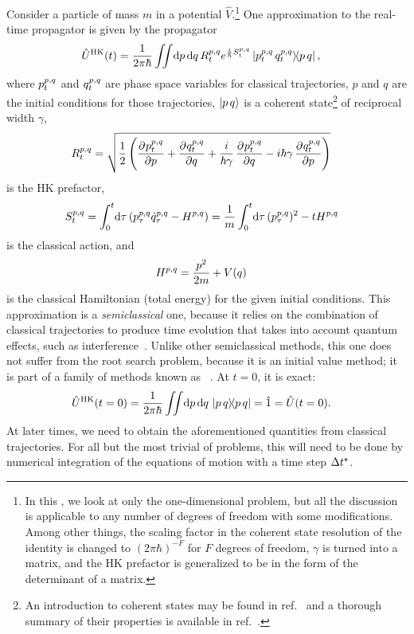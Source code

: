 Consider a particle of mass $m$ in a potential $\hat{V}$.\footnote{
	In this , we look at only the one-dimensional problem, but all the discussion is applicable to any number of degrees of freedom with some modifications.
	Among other things, the scaling factor in the coherent state resolution of the identity is changed to $(2 \pi \hbar)^{-F}$ for $F$ degrees of freedom, $\gamma$ is turned into a matrix, and the HK prefactor is generalized to be in the form of the determinant of a matrix.
}
One approximation to the real-time propagator is given by the  propagator~\cite{miller2002alternate}
\begin{align}
	\hat{U}\hk(t)
	&= \frac{1}{2 \pi \hbar} \iint\! \dif p \dif q \,
			R\coh{p}{q}_t e^{\frac{i}{\hbar} S\coh{p}{q}_t}
			\ketbra{p\coh{p}{q}_t \, q\coh{p}{q}_t}{p \, q},
\end{align}
where $p^{p,q}_t$ and $q^{p,q}_t$ are phase space variables for classical trajectories, $p$ and $q$ are the initial conditions for those trajectories, $\ket{p \, q}$ is a coherent state\footnote{
	An introduction to coherent states may be found in ref.~\cite[242-245]{schulman1996techniques} and a thorough summary of their properties is available in ref.~\cite[99-106]{gardiner2004quantum}.
} of reciprocal width $\gamma$,
\begin{align}
	R\coh{p}{q}_t
	&= \sqrt{\frac{1}{2} \left(
			\dpd{p\coh{p}{q}_t}{p}
			+ \dpd{q\coh{p}{q}_t}{q}
			+ \frac{i}{\hbar \gamma} \dpd{p\coh{p}{q}_t}{q}
			- i \hbar \gamma \dpd{q\coh{p}{q}_t}{p}
		\right)}
\end{align}
is the HK prefactor,
\begin{align}
	S\coh{p}{q}_t
	&= \int_0^t\! \dif \tau \, (p\coh{p}{q}_\tau \dot{q}\coh{p}{q}_\tau - H\coh{p}{q})
	= \frac{1}{m} \int_0^t\! \dif \tau \, (p\coh{p}{q}_\tau)^2 - t H\coh{p}{q}
\end{align}
is the classical action, and
\begin{align}
	H^{p,q}
	&= \frac{p^2}{2 m} + V(q)
\end{align}
is the classical Hamiltonian (total energy) for the given initial conditions.
This approximation is a \emph{semiclassical} one, because it relies on the combination of classical trajectories to produce time evolution that takes into account quantum effects, such as interference~\cite{gelabert2000log,thoss2001generalized}.
Unlike other semiclassical methods, this one does not suffer from the root search problem, because it is an initial value method; it is part of a family of methods known as ~\cite{gelabert2000log}.
At $t = 0$, it is exact:
\begin{align}
	\hat{U}\hk(t = 0)
	&= \frac{1}{2 \pi \hbar} \iint\! \dif p \dif q \, \ketbra{p \, q}{p \, q}
	= \hat{1}
	= \hat{U}(t = 0).
\end{align}
At later times, we need to obtain the aforementioned quantities from classical trajectories.
For all but the most trivial of problems, this will need to be done by numerical integration of the equations of motion with a time step $\Delta t^\star$.

